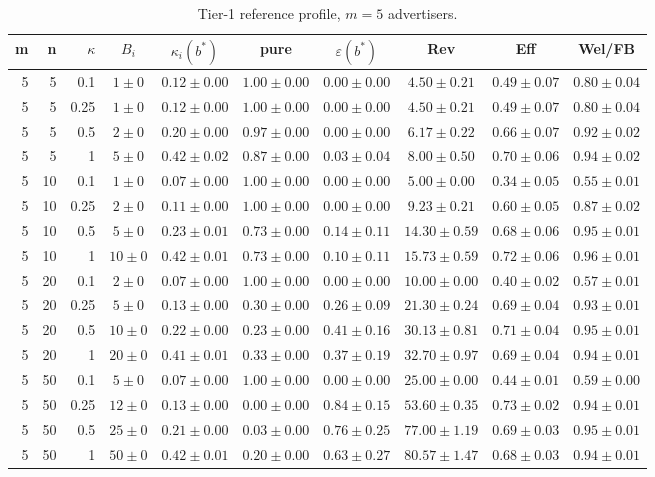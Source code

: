 \begin{table}[htbp]
\centering
\scriptsize
\caption{Tier-1 reference profile, $m=5$ advertisers.}
\label{tab:tier1_m5}
\begin{tabular}{@{}rrrccccccc@{}}
\toprule
m & n & $\kappa$ & $B_i$ & $\kappa_i(b^*)$ & pure & $\varepsilon(b^*)$ & Rev & Eff & Wel/FB \\
\midrule
5 & 5 & 0.1 & $1 \pm 0$ & $0.12 \pm 0.00$ & $1.00 \pm 0.00$ & $0.00 \pm 0.00$ & $4.50 \pm 0.21$ & $0.49 \pm 0.07$ & $0.80 \pm 0.04$ \\
5 & 5 & 0.25 & $1 \pm 0$ & $0.12 \pm 0.00$ & $1.00 \pm 0.00$ & $0.00 \pm 0.00$ & $4.50 \pm 0.21$ & $0.49 \pm 0.07$ & $0.80 \pm 0.04$ \\
5 & 5 & 0.5 & $2 \pm 0$ & $0.20 \pm 0.00$ & $0.97 \pm 0.00$ & $0.00 \pm 0.00$ & $6.17 \pm 0.22$ & $0.66 \pm 0.07$ & $0.92 \pm 0.02$ \\
5 & 5 & 1 & $5 \pm 0$ & $0.42 \pm 0.02$ & $0.87 \pm 0.00$ & $0.03 \pm 0.04$ & $8.00 \pm 0.50$ & $0.70 \pm 0.06$ & $0.94 \pm 0.02$ \\
5 & 10 & 0.1 & $1 \pm 0$ & $0.07 \pm 0.00$ & $1.00 \pm 0.00$ & $0.00 \pm 0.00$ & $5.00 \pm 0.00$ & $0.34 \pm 0.05$ & $0.55 \pm 0.01$ \\
5 & 10 & 0.25 & $2 \pm 0$ & $0.11 \pm 0.00$ & $1.00 \pm 0.00$ & $0.00 \pm 0.00$ & $9.23 \pm 0.21$ & $0.60 \pm 0.05$ & $0.87 \pm 0.02$ \\
5 & 10 & 0.5 & $5 \pm 0$ & $0.23 \pm 0.01$ & $0.73 \pm 0.00$ & $0.14 \pm 0.11$ & $14.30 \pm 0.59$ & $0.68 \pm 0.06$ & $0.95 \pm 0.01$ \\
5 & 10 & 1 & $10 \pm 0$ & $0.42 \pm 0.01$ & $0.73 \pm 0.00$ & $0.10 \pm 0.11$ & $15.73 \pm 0.59$ & $0.72 \pm 0.06$ & $0.96 \pm 0.01$ \\
5 & 20 & 0.1 & $2 \pm 0$ & $0.07 \pm 0.00$ & $1.00 \pm 0.00$ & $0.00 \pm 0.00$ & $10.00 \pm 0.00$ & $0.40 \pm 0.02$ & $0.57 \pm 0.01$ \\
5 & 20 & 0.25 & $5 \pm 0$ & $0.13 \pm 0.00$ & $0.30 \pm 0.00$ & $0.26 \pm 0.09$ & $21.30 \pm 0.24$ & $0.69 \pm 0.04$ & $0.93 \pm 0.01$ \\
5 & 20 & 0.5 & $10 \pm 0$ & $0.22 \pm 0.00$ & $0.23 \pm 0.00$ & $0.41 \pm 0.16$ & $30.13 \pm 0.81$ & $0.71 \pm 0.04$ & $0.95 \pm 0.01$ \\
5 & 20 & 1 & $20 \pm 0$ & $0.41 \pm 0.01$ & $0.33 \pm 0.00$ & $0.37 \pm 0.19$ & $32.70 \pm 0.97$ & $0.69 \pm 0.04$ & $0.94 \pm 0.01$ \\
5 & 50 & 0.1 & $5 \pm 0$ & $0.07 \pm 0.00$ & $1.00 \pm 0.00$ & $0.00 \pm 0.00$ & $25.00 \pm 0.00$ & $0.44 \pm 0.01$ & $0.59 \pm 0.00$ \\
5 & 50 & 0.25 & $12 \pm 0$ & $0.13 \pm 0.00$ & $0.00 \pm 0.00$ & $0.84 \pm 0.15$ & $53.60 \pm 0.35$ & $0.73 \pm 0.02$ & $0.94 \pm 0.01$ \\
5 & 50 & 0.5 & $25 \pm 0$ & $0.21 \pm 0.00$ & $0.03 \pm 0.00$ & $0.76 \pm 0.25$ & $77.00 \pm 1.19$ & $0.69 \pm 0.03$ & $0.95 \pm 0.01$ \\
5 & 50 & 1 & $50 \pm 0$ & $0.42 \pm 0.01$ & $0.20 \pm 0.00$ & $0.63 \pm 0.27$ & $80.57 \pm 1.47$ & $0.68 \pm 0.03$ & $0.94 \pm 0.01$ \\
\bottomrule
\end{tabular}
\end{table}
